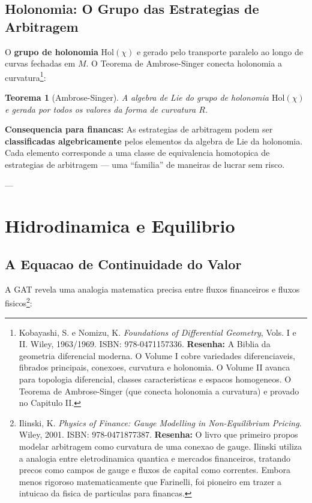 \documentclass[12pt,a4paper]{article}
\newtheorem{teo}{Teorema}[section]
\theoremstyle{remark}
\begin{document}
\subsection{Holonomia: O Grupo das Estrategias de Arbitragem}

O \textbf{grupo de holonomia} $\text{Hol}(\chi)$ e gerado pelo transporte
paralelo ao longo de curvas fechadas em $M$. O Teorema de Ambrose-Singer
conecta holonomia a curvatura\footnote{Kobayashi, S. e Nomizu, K.
\textit{Foundations of Differential Geometry}, Vols. I e II. Wiley, 1963/1969.
ISBN: 978-0471157336. \textbf{Resenha:} A Biblia da geometria diferencial
moderna. O Volume I cobre variedades diferenciaveis, fibrados principais,
conexoes, curvatura e holonomia. O Volume II avanca para topologia
diferencial, classes caracteristicas e espacos homogeneos. O Teorema de
Ambrose-Singer (que conecta holonomia a curvatura) e provado no Capitulo II.}:

\begin{teo}[Ambrose-Singer]
A algebra de Lie do grupo de holonomia $\text{Hol}(\chi)$ e gerada por todos os
valores da forma de curvatura $R$.
\end{teo}

\textbf{Consequencia para financas:} As estrategias de arbitragem podem ser
\textbf{classificadas algebricamente} pelos elementos da algebra de Lie da
holonomia. Cada elemento corresponde a uma classe de equivalencia homotopica
de estrategias de arbitragem — uma ``familia'' de maneiras de lucrar sem risco.

---

\section{Hidrodinamica e Equilibrio}

\subsection{A Equacao de Continuidade do Valor}

A GAT revela uma analogia matematica precisa entre fluxos financeiros e
fluxos fisicos\footnote{Ilinski, K. \textit{Physics of Finance: Gauge Modelling
in Non-Equilibrium Pricing}. Wiley, 2001. ISBN: 978-0471877387. \textbf{Resenha:}
O livro que primeiro propos modelar arbitragem como curvatura de uma conexao de
gauge. Ilinski utiliza a analogia entre eletrodinamica quantica e mercados
financeiros, tratando precos como campos de gauge e fluxos de capital como
correntes. Embora menos rigoroso matematicamente que Farinelli, foi pioneiro em
trazer a intuicao da fisica de particulas para financas.}:
\end{document}
